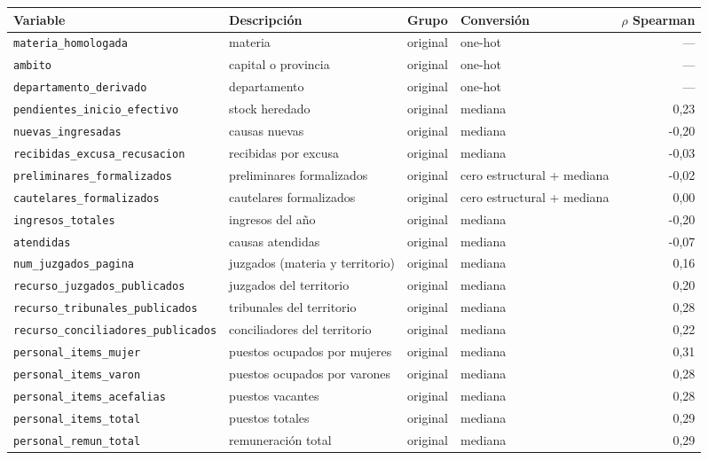 \begin{tabular}{lp{5.2cm}llr}
\toprule
Variable & Descripción & Grupo & Conversión & $\rho$ Spearman \\
\midrule
\texttt{materia\_homologada} & materia & original & one-hot & --- \\
\texttt{ambito} & capital o provincia & original & one-hot & --- \\
\texttt{departamento\_derivado} & departamento & original & one-hot & --- \\
\texttt{pendientes\_inicio\_efectivo} & stock heredado & original & mediana & 0,23 \\
\texttt{nuevas\_ingresadas} & causas nuevas & original & mediana & -0,20 \\
\texttt{recibidas\_excusa\_recusacion} & recibidas por excusa & original & mediana & -0,03 \\
\texttt{preliminares\_formalizados} & preliminares formalizados & original & cero estructural + mediana & -0,02 \\
\texttt{cautelares\_formalizados} & cautelares formalizados & original & cero estructural + mediana & 0,00 \\
\texttt{ingresos\_totales} & ingresos del año & original & mediana & -0,20 \\
\texttt{atendidas} & causas atendidas & original & mediana & -0,07 \\
\texttt{num\_juzgados\_pagina} & juzgados (materia y territorio) & original & mediana & 0,16 \\
\texttt{recurso\_juzgados\_publicados} & juzgados del territorio & original & mediana & 0,20 \\
\texttt{recurso\_tribunales\_publicados} & tribunales del territorio & original & mediana & 0,28 \\
\texttt{recurso\_conciliadores\_publicados} & conciliadores del territorio & original & mediana & 0,22 \\
\texttt{personal\_items\_mujer} & puestos ocupados por mujeres & original & mediana & 0,31 \\
\texttt{personal\_items\_varon} & puestos ocupados por varones & original & mediana & 0,28 \\
\texttt{personal\_items\_acefalias} & puestos vacantes & original & mediana & 0,28 \\
\texttt{personal\_items\_total} & puestos totales & original & mediana & 0,29 \\
\texttt{personal\_remun\_total} & remuneración total & original & mediana & 0,29 \\

\end{tabular}
